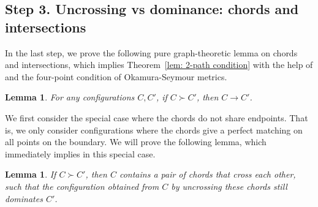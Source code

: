 \documentclass[11pt]{article}
\newtheorem{lemma}[theorem]{Lemma}
\begin{document}
\subsection{Step 3. Uncrossing vs dominance: chords and intersections}

In the last step, we prove the following pure graph-theoretic lemma on chords and intersections, which implies Theorem~\ref{lem: 2-path condition} with the help of  and the four-point condition of Okamura-Seymour metrics.

\begin{lemma} \label{thm:main-uncross}
For any configurations $C,C'$, if $C\succ C'$, then $C\to C'$.
\end{lemma}

We first consider the special case where the chords do not share endpoints.
That is, we only consider configurations where the chords give a perfect matching on all points on the boundary.
We will prove the following lemma, which immediately implies  in this special case.

\begin{lemma} \label{lem:find-one}
If $C\succ C'$, then $C$ contains a pair of chords that cross each other, such that the configuration obtained from $C$ by uncrossing these chords still dominates $C'$.
\end{lemma}
\end{document}
